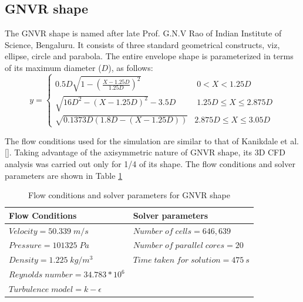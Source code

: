 \subsection{GNVR shape \cite{Ram2010}}
The GNVR shape  is named after late Prof. G.N.V Rao of Indian Institute of Science, Bengaluru. It consists of three standard geometrical constructs, viz, ellipse, circle and parabola. The entire envelope shape is parameterized in terms of its maximum diameter ($D$), as follows:
\begin{equation}
y = \begin{cases}
0.5D \sqrt{1-(\frac{X-1.25D}{1.25D})^2} & \; 0 < X < 1.25D  \\
\sqrt{16D^2 - (X-1.25D)^2 } - 3.5 D & \; 1.25D \le X \le 2.875D \\
\sqrt{0.1373D(1.8D - (X-1.25D))} &  2.875D \le X \le 3.05D 
\end{cases}
\label{GNVR eqn}
\end{equation}


The flow conditions used for the simulation are similar to that of Kanikdale et al. []. Taking advantage of the axisymmetric nature of GNVR shape, its 3D CFD analysis was carried out only for 1/4 of its shape. The flow conditions and solver parameters are shown in Table \ref{Flow conditions and solver parametres for GNVR shape}

\begin{table}[H]
	\caption{Flow conditions and solver parameters for GNVR shape}
	\label{Flow conditions and solver parametres for GNVR shape}
	\centering
	\begin{tabular}{ll}
		\hline \hline
		Flow Conditions & Solver parameters  \\ \hline \hline
		
		$ Velocity = 50.339 \; m/s$ & $Number \; of \; cells = 646,639$    \\  
		$ Pressure = 101325 \; Pa $ & $ Number \; of \; parallel \; cores = 20 $     \\
		$ Density = 1.225 \; kg/m^{3} $ & $ Time \; taken \; for \; solution = 475~s  $    \\
		$ Reynolds \; number = 34.783 * 10^{6} $ &    \\
		$ Turbulence \; model = k - \epsilon $ &     \\
		\hline
	\end{tabular}
\end{table}





